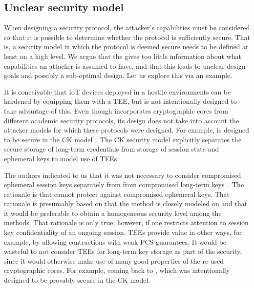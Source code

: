 \documentclass[runningheads, envcountsame, a4paper, draft, x11names]{llncs}
\newcommand{\spacehack}{\vspace{-1em}}
\begin{document}
\subsection{Unclear security model}
When designing a security protocol, the attacker's capabilities must be
considered so that it is possible to determine whether the protocol is
sufficiently secure.
%
That is, a security model in which the protocol is deemed
secure needs to be defined at least on a high level.
%
We argue that the \mSpec{} gives too little information about what capabilities
an attacker is assumed to have, and that this leads to unclear design goals and
possibly a sub-optimal design.
%
Let us explore this via an example.
%

It is conceivable that IoT devices deployed in a hostile environments can be
hardened by equipping them with a TEE, but \mEdhoc{} is not intentionally
designed to take advantage of this.
%
Even though \mEdhoc{} incorporates cryptographic cores from different academic
security protocols, its design does not take into account the attacker models
for which these protocols were designed.
%
For example, \mOptls{} is designed to be secure in the CK
model~\cite{DBLP:conf/crypto/CanettiK02}.
%
The CK security model explicitly separates the secure storage of long-term
credentials from storage of session state and ephemeral keys to model
use of TEEs.
%

The \mEdhoc{} authors indicated to us that it was
not necessary to consider compromised ephemeral session keys separately from
from compromised long-term keys~\cite{personalCommunication}.
%
The rationale is that \mSigma{} cannot protect against compromised ephemeral
keys.
%
That rationale is presumably based on that the \mSigSig{} method is
closely modeled on \mSigmaI{} and that it would be preferable to obtain a
homogeneous security level among the \mEdhoc{}
methods\cite{personalCommunication}.
%
That rationale is only true, however, if one restricts attention to session key
confidentiality of an ongoing session.
%
TEEs provide value in other ways, for example, by allowing contractions with
weak PCS guarantees.
%
It would be wasteful to not consider TEEs for long-term key storage as part of
the security, since it would otherwise make use of many good properties of the
re-used cryptographic cores.
%
For example, coming back to \mOptls{}, which was intentionally
designed to be provably secure in the CK model.
%

\spacehack
\end{document}
